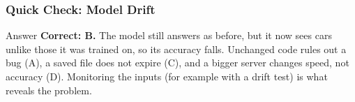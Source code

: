 \begin{frame}[fragile]\frametitle{Quick Check: Model Drift}
\begin{block}{Answer}
\textbf{Correct: B.} The model still answers as before, but it now sees cars unlike those it was trained on, so its accuracy falls. Unchanged code rules out a bug (A), a saved file does not expire (C), and a bigger server changes speed, not accuracy (D). Monitoring the inputs (for example with a drift test) is what reveals the problem.
\end{block}
\end{frame}

